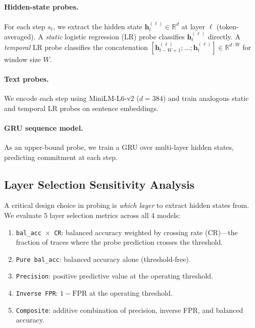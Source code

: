 \documentclass[11pt]{article}
\begin{document}
\paragraph{Hidden-state probes.}
For each step $s_t$, we extract the hidden state $\mathbf{h}_t^{(\ell)} \in \mathbb{R}^d$ at layer $\ell$ (token-averaged).
A \emph{static} logistic regression (LR) probe classifies $\mathbf{h}_t^{(\ell)}$ directly.
A \emph{temporal} LR probe classifies the concatenation $[\mathbf{h}_{t-W+1}^{(\ell)}; \ldots; \mathbf{h}_t^{(\ell)}] \in \mathbb{R}^{d \cdot W}$ for window size $W$.

\paragraph{Text probes.}
We encode each step using MiniLM-L6-v2 \cite{reimers2019sentencebert} ($d{=}384$) and train analogous static and temporal LR probes on sentence embeddings.

\paragraph{GRU sequence model.}
As an upper-bound probe, we train a GRU over multi-layer hidden states, predicting commitment at each step.

\subsection{Layer Selection Sensitivity Analysis}
\label{sec:layer-selection}

A critical design choice in probing is \emph{which layer} to extract hidden states from.
We evaluate 5 layer selection metrics across all 4 models:

\begin{enumerate}
\item \texttt{bal\_acc $\times$ CR}: balanced accuracy weighted by crossing rate (CR)---the fraction of traces where the probe prediction crosses the threshold.
\item \texttt{Pure bal\_acc}: balanced accuracy alone (threshold-free).
\item \texttt{Precision}: positive predictive value at the operating threshold.
\item \texttt{Inverse FPR}: $1 - \text{FPR}$ at the operating threshold.
\item \texttt{Composite}: additive combination of precision, inverse FPR, and balanced accuracy.
\end{enumerate}
\end{document}
